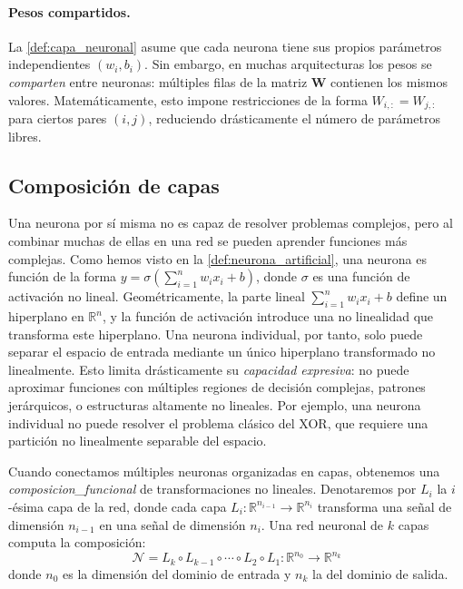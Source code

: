 \paragraph{Pesos compartidos.}

La \autoref{def:capa_neuronal} asume que cada neurona tiene sus propios parámetros independientes $(w_i, b_i)$. Sin embargo, en muchas arquitecturas los pesos se \textit{comparten} entre neuronas: múltiples filas de la matriz $\mathbf{W}$ contienen los mismos valores. Matemáticamente, esto impone restricciones de la forma $W_{i,:} = W_{j,:}$ para ciertos pares $(i,j)$, reduciendo drásticamente el número de parámetros libres.

\subsection{Composición de capas}

Una neurona por sí misma no es capaz de resolver problemas complejos, pero al combinar muchas de ellas en una red se pueden aprender funciones más complejas. Como hemos visto en la \autoref{def:neurona_artificial}, una neurona es función de la forma $y = \sigma\left(\sum_{i=1}^n w_i x_i + b\right)$, donde $\sigma$ es una función de activación no lineal. Geométricamente, la parte lineal $\sum_{i=1}^n w_i x_i + b$ define un hiperplano en $\mathbb{R}^n$, y la función de activación introduce una no linealidad que transforma este hiperplano. Una neurona individual, por tanto, solo puede separar el espacio de entrada mediante un único hiperplano transformado no linealmente. Esto limita drásticamente su \textit{capacidad expresiva}: no puede aproximar funciones con múltiples regiones de decisión complejas, patrones jerárquicos, o estructuras altamente no lineales. Por ejemplo, una neurona individual no puede resolver el problema clásico del XOR, que requiere una partición no linealmente separable del espacio.

Cuando conectamos múltiples neuronas organizadas en capas, obtenemos una \textit{\gls{composicion_funcional}} de transformaciones no lineales. Denotaremos por $L_i$ la $i$-ésima capa de la red, donde cada capa $L_i: \mathbb{R}^{n_{i-1}} \to \mathbb{R}^{n_i}$ transforma una señal de dimensión $n_{i-1}$ en una señal de dimensión $n_i$. Una red neuronal de $k$ capas computa la composición:
\[
\mathcal{N} = L_k \circ L_{k-1} \circ \cdots \circ L_2 \circ L_1: \mathbb{R}^{n_0} \to \mathbb{R}^{n_k}
\]
donde $n_0$ es la dimensión del dominio de entrada y $n_k$ la del dominio de salida.

